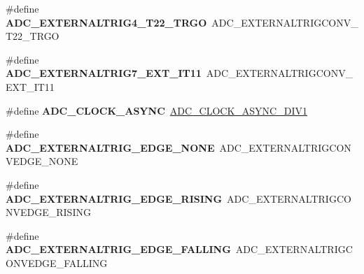 \begin{DoxyCompactItemize}
\item 
\hypertarget{group___h_a_l___a_d_c___aliased___defines_ga671cb20b99d24f3c9923ac7777e5f84e}{\#define {\bfseries A\-D\-C\-\_\-\-E\-X\-T\-E\-R\-N\-A\-L\-T\-R\-I\-G4\-\_\-\-T22\-\_\-\-T\-R\-G\-O}~A\-D\-C\-\_\-\-E\-X\-T\-E\-R\-N\-A\-L\-T\-R\-I\-G\-C\-O\-N\-V\-\_\-\-T22\-\_\-\-T\-R\-G\-O}\label{group___h_a_l___a_d_c___aliased___defines_ga671cb20b99d24f3c9923ac7777e5f84e}

\item 
\hypertarget{group___h_a_l___a_d_c___aliased___defines_ga54407c5dc446f7d5425d8ac135bee69e}{\#define {\bfseries A\-D\-C\-\_\-\-E\-X\-T\-E\-R\-N\-A\-L\-T\-R\-I\-G7\-\_\-\-E\-X\-T\-\_\-\-I\-T11}~A\-D\-C\-\_\-\-E\-X\-T\-E\-R\-N\-A\-L\-T\-R\-I\-G\-C\-O\-N\-V\-\_\-\-E\-X\-T\-\_\-\-I\-T11}\label{group___h_a_l___a_d_c___aliased___defines_ga54407c5dc446f7d5425d8ac135bee69e}

\item 
\hypertarget{group___h_a_l___a_d_c___aliased___defines_gae507056750621dbc26572874e89ef791}{\#define {\bfseries A\-D\-C\-\_\-\-C\-L\-O\-C\-K\-\_\-\-A\-S\-Y\-N\-C}~\hyperlink{group___a_d_c___clock_prescaler_ga092c0277fd6db9b905d229c9f8dda8ab}{A\-D\-C\-\_\-\-C\-L\-O\-C\-K\-\_\-\-A\-S\-Y\-N\-C\-\_\-\-D\-I\-V1}}\label{group___h_a_l___a_d_c___aliased___defines_gae507056750621dbc26572874e89ef791}

\item 
\hypertarget{group___h_a_l___a_d_c___aliased___defines_ga324129b8c65e1f89b0002c31297935eb}{\#define {\bfseries A\-D\-C\-\_\-\-E\-X\-T\-E\-R\-N\-A\-L\-T\-R\-I\-G\-\_\-\-E\-D\-G\-E\-\_\-\-N\-O\-N\-E}~A\-D\-C\-\_\-\-E\-X\-T\-E\-R\-N\-A\-L\-T\-R\-I\-G\-C\-O\-N\-V\-E\-D\-G\-E\-\_\-\-N\-O\-N\-E}\label{group___h_a_l___a_d_c___aliased___defines_ga324129b8c65e1f89b0002c31297935eb}

\item 
\hypertarget{group___h_a_l___a_d_c___aliased___defines_ga7955225cafbadae21be3c9eaaab4bd58}{\#define {\bfseries A\-D\-C\-\_\-\-E\-X\-T\-E\-R\-N\-A\-L\-T\-R\-I\-G\-\_\-\-E\-D\-G\-E\-\_\-\-R\-I\-S\-I\-N\-G}~A\-D\-C\-\_\-\-E\-X\-T\-E\-R\-N\-A\-L\-T\-R\-I\-G\-C\-O\-N\-V\-E\-D\-G\-E\-\_\-\-R\-I\-S\-I\-N\-G}\label{group___h_a_l___a_d_c___aliased___defines_ga7955225cafbadae21be3c9eaaab4bd58}

\item 
\hypertarget{group___h_a_l___a_d_c___aliased___defines_ga0b539c9290d819da8932016f4a4ca2a1}{\#define {\bfseries A\-D\-C\-\_\-\-E\-X\-T\-E\-R\-N\-A\-L\-T\-R\-I\-G\-\_\-\-E\-D\-G\-E\-\_\-\-F\-A\-L\-L\-I\-N\-G}~A\-D\-C\-\_\-\-E\-X\-T\-E\-R\-N\-A\-L\-T\-R\-I\-G\-C\-O\-N\-V\-E\-D\-G\-E\-\_\-\-F\-A\-L\-L\-I\-N\-G}\label{group___h_a_l___a_d_c___aliased___defines_ga0b539c9290d819da8932016f4a4ca2a1}


\end{DoxyCompactItemize}
